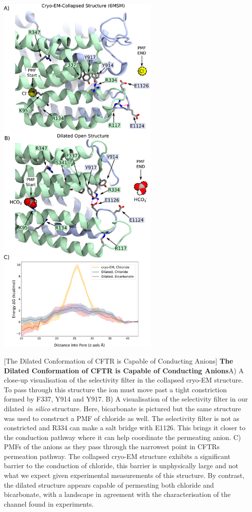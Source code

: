 	\begin{center}
		\includegraphics[width=0.6\textwidth]{figures/opening/pmf_fig_1_combined.pdf}
	\end{center}
\begingroup

	[The Dilated Conformation of CFTR is Capable of Conducting Anions] {\textbf{The Dilated Conformation of CFTR is Capable of Conducting Anions}}{A) A close-up visualisation of the selectivity filter in the collapsed cryo-EM structure. To pass through this structure the ion must move past a tight constriction formed by F337, Y914 and Y917. B) A visualisation of the selectivity filter in our dilated \textit{in silico} structure. Here, bicarbonate is pictured but the same structure was used to construct a PMF of chloride as well. The selectivity filter is not as constricted and R334 can make a salt bridge with E1126. This brings it closer to the conduction pathway where it can help coordinate the permeating anion. C) PMFs of the anions as they pass through the narrowest point in CFTRs permeation pathway. The collapsed cryo-EM structure exhibits a significant barrier to the conduction of chloride, this barrier is unphysically large and not what we expect given experimental measurements of this structure. By contrast, the dilated structure appears capable of permeating both chloride and bicarbonate, with a landscape in agreement with the characterisation of the channel found in experiments. }
	\label{US_anions}
	\endgroup



